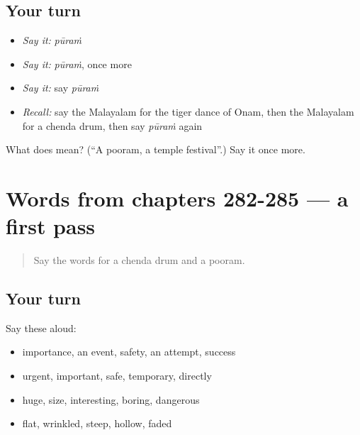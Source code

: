\subsection*{Your turn}
\begin{itemize}
\raggedright
  \item \emph{Say it:} \emph{pūraṁ}
  \item \emph{Say it:} \emph{pūraṁ}, once more
  \item \emph{Say it:} say \emph{pūraṁ}
  \item \emph{Recall:} say the Malayalam for the tiger dance of Onam, then the Malayalam for a chenda drum, then say \emph{pūraṁ} again
\end{itemize}

\begin{tcolorbox}[breakable,colback=teal!4,colframe=teal!35!black,title={Before you move on}]
What does  mean? (\textquotedblleft{}A pooram, a temple festival\textquotedblright{}.) Say it once more.
\end{tcolorbox}
\section[(dialogue)]{Words from chapters 282-285 — a first pass}

\label{lesson:ML-R290-first-pass-words-from-chapters-282-285}



\begin{quote}
Say the words for a chenda drum and a pooram.
\end{quote}

\subsection*{Your turn}
Say these aloud:

\begin{itemize}
\raggedright
  \item importance, an event, safety, an attempt, success
  \item urgent, important, safe, temporary, directly
  \item huge, size, interesting, boring, dangerous
  \item flat, wrinkled, steep, hollow, faded
\end{itemize}

